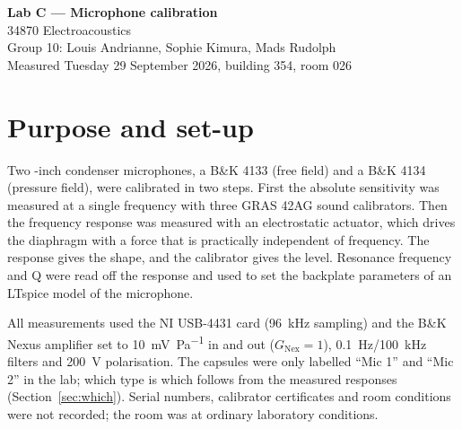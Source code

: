 \documentclass[a4paper,10pt]{article}
\begin{document}
\begin{center}
{\Large\bfseries Lab C --- Microphone calibration}\\[5pt]
34870 Electroacoustics\\[4pt]
Group 10: Louis Andrianne, Sophie Kimura, Mads Rudolph\\[4pt]
Measured Tuesday 29 September 2026, building 354, room 026
\end{center}
\thispagestyle{fancy}


\section{Purpose and set-up}
Two \textonehalf-inch condenser microphones, a B\&K 4133 (free field) and a B\&K 4134
(pressure field), were calibrated in two steps. First the absolute sensitivity was
measured at a single frequency with three GRAS 42AG sound calibrators. Then the frequency
response was measured with an electrostatic actuator, which drives the diaphragm with a
force that is practically independent of frequency. The response gives the shape, and the
calibrator gives the level. Resonance frequency and Q were read off the response and used
to set the backplate parameters of an LTspice model of the microphone.

All measurements used the NI USB-4431 card (\SI{96}{\kilo\hertz} sampling) and the
B\&K Nexus amplifier set to \SI{10}{\milli\volt\per\pascal} in and out
($G_{\mathrm{Nex}}=1$), \SI{0.1}{\hertz}/\SI{100}{\kilo\hertz} filters and
\SI{200}{\volt} polarisation. The capsules were only labelled ``Mic 1'' and ``Mic 2''
in the lab; which type is which follows from the measured responses
(Section~\ref{sec:which}). Serial numbers, calibrator certificates and room conditions
were not recorded; the room was at ordinary laboratory conditions.
\end{document}
